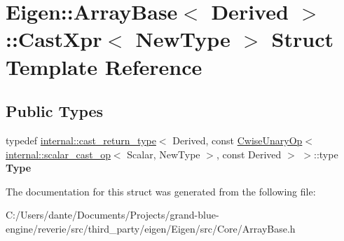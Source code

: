 \hypertarget{struct_eigen_1_1_array_base_1_1_cast_xpr}{}\section{Eigen\+::Array\+Base$<$ Derived $>$\+::Cast\+Xpr$<$ New\+Type $>$ Struct Template Reference}
\label{struct_eigen_1_1_array_base_1_1_cast_xpr}
\subsection*{Public Types}
\begin{DoxyCompactItemize}
\item 
\mbox{\label{struct_eigen_1_1_array_base_1_1_cast_xpr_a909bc162c4bf7829a0f0e01185fdf15b}} 
typedef \mbox{\hyperlink{struct_eigen_1_1internal_1_1cast__return__type}{internal\+::cast\+\_\+return\+\_\+type}}$<$ Derived, const \mbox{\hyperlink{class_eigen_1_1_cwise_unary_op}{Cwise\+Unary\+Op}}$<$ \mbox{\hyperlink{struct_eigen_1_1internal_1_1scalar__cast__op}{internal\+::scalar\+\_\+cast\+\_\+op}}$<$ Scalar, New\+Type $>$, const Derived $>$ $>$\+::type {\bfseries Type}
\end{DoxyCompactItemize}


The documentation for this struct was generated from the following file\+:\begin{DoxyCompactItemize}
\item 
C\+:/\+Users/dante/\+Documents/\+Projects/grand-\/blue-\/engine/reverie/src/third\+\_\+party/eigen/\+Eigen/src/\+Core/Array\+Base.\+h\end{DoxyCompactItemize}
